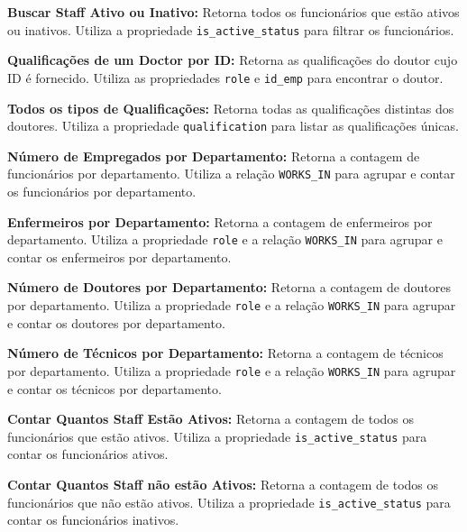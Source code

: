 \vspace{0.15cm}
\textbf{Buscar Staff Ativo ou Inativo:} Retorna todos os funcionários que estão ativos ou inativos. Utiliza a propriedade \texttt{is\_active\_status} para filtrar os funcionários.

\vspace{0.15cm}
\textbf{Qualificações de um Doctor por ID:} Retorna as qualificações do doutor cujo ID é fornecido. Utiliza as propriedades \texttt{role} e \texttt{id\_emp} para encontrar o doutor.

\vspace{0.15cm}
\textbf{Todos os tipos de Qualificações:} Retorna todas as qualificações distintas dos doutores. Utiliza a propriedade \texttt{qualification} para listar as qualificações únicas.

\vspace{0.15cm}
\textbf{Número de Empregados por Departamento:} Retorna a contagem de funcionários por departamento. Utiliza a relação \texttt{WORKS\_IN} para agrupar e contar os funcionários por departamento.

\vspace{0.15cm}
\textbf{Enfermeiros por Departamento:} Retorna a contagem de enfermeiros por departamento. Utiliza a propriedade \texttt{role} e a relação \texttt{WORKS\_IN} para agrupar e contar os enfermeiros por departamento.

\vspace{0.15cm}
\textbf{Número de Doutores por Departamento:} Retorna a contagem de doutores por departamento. Utiliza a propriedade \texttt{role} e a relação \texttt{WORKS\_IN} para agrupar e contar os doutores por departamento.

\vspace{0.15cm}
\textbf{Número de Técnicos por Departamento:} Retorna a contagem de técnicos por departamento. Utiliza a propriedade \texttt{role} e a relação \texttt{WORKS\_IN} para agrupar e contar os técnicos por departamento.

\vspace{0.15cm}
\textbf{Contar Quantos Staff Estão Ativos:} Retorna a contagem de todos os funcionários que estão ativos. Utiliza a propriedade \texttt{is\_active\_status} para contar os funcionários ativos.

\vspace{0.15cm}
\textbf{Contar Quantos Staff não estão Ativos:} Retorna a contagem de todos os funcionários que não estão ativos. Utiliza a propriedade \texttt{is\_active\_status} para contar os funcionários inativos.

